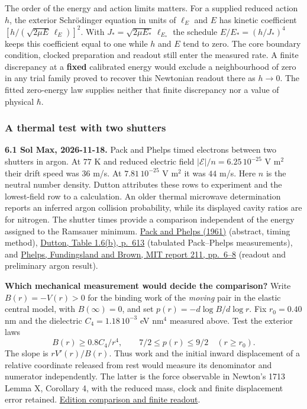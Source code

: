 \documentclass[11pt,a4paper]{article}
\begin{document}
The order of the energy and action limits matters. For a supplied
reduced action \(h\), the exterior Schrödinger equation in units of
\(\ell_E\) and \(E\) has kinetic coefficient
\([h/(\sqrt{2\mu E}\,\ell_E)]^2\). With
\(J_*=\sqrt{2\mu E_*}\,\ell_{E_*}\) the schedule \(E/E_*=(h/J_*)^4\)
keeps this coefficient equal to one while \(h\) and \(E\) tend to zero.
The core boundary condition, clocked preparation and readout still enter
the measured rate. A finite discrepancy at a \textbf{fixed} calibrated
energy would exclude a neighbourhood of zero in any trial family proved
to recover this Newtonian readout there as \(h\to0\). The fitted
zero-energy law supplies neither that finite discrepancy nor a value of
physical \(\hbar\).

\subsubsection{A thermal test with two
shutters}\label{a-thermal-test-with-two-shutters}

\textbf{6.1 Sol Max, 2026-11-18.} Pack and Phelps timed electrons
between two shutters in argon. At \(77\) K and reduced electric field
\(|\mathcal E|/n=6.25\,10^{-25}\) V m\(^2\) their drift speed was \(36\)
m/s. At \(7.81\,10^{-25}\) V m\(^2\) it was \(44\) m/s. Here \(n\) is
the neutral number density. Dutton attributes these rows to experiment
and the lowest-field row to a calculation. An older thermal microwave
determination reports an inferred argon collision probability, while its
displayed cavity ratios are for nitrogen. The shutter times provide a
comparison independent of the energy assigned to the Ramsauer minimum.
\href{https://doi.org/10.1103/PhysRev.121.798}{Pack and Phelps (1961)}
(abstract, timing method),
\href{https://srd.nist.gov/jpcrdreprint/1.555525.pdf\#page=38}{Dutton,
Table 1.6(b), p.~613} (tabulated Pack--Phelps measurements), and
\href{https://hdl.handle.net/1721.1/4853}{Phelps, Fundingsland and
Brown, MIT report 211, pp.~6--8} (readout and preliminary argon result).

\textbf{Which mechanical measurement would decide the comparison?} Write
\(B(r)=-V(r)>0\) for the binding work of the \emph{moving} pair in the
elastic central model, with \(B(\infty)=0\), and set
\(p(r)=-d\log B/d\log r\). Fix \(r_0=0.40\) nm and the dielectric
\(C_4=1.18\,10^{-3}\) eV nm\(^4\) measured above. Test the exterior laws
\[
 B(r)\ge 0.8 C_4/r^4,\qquad 7/2\le p(r)\le 9/2
 \quad(r\ge r_0).
\] The slope is \(rV'(r)/B(r)\). Thus work and the initial inward
displacement of a relative coordinate released from rest would measure
its denominator and numerator independently. The latter is the force
observable in Newton's 1713 Lemma X, Corollary 4, with the reduced mass,
clock and finite displacement error retained.
\href{newton-insertion-action.md\#lemma-x-and-the-measurement-of-initial-force}{Edition
comparison and finite readout}.
\end{document}

